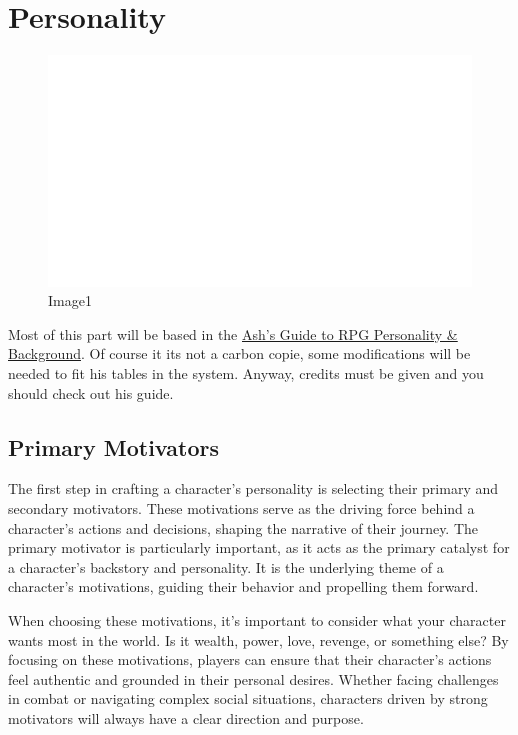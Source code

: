 \hypertarget{personality}{%
\section{Personality}\label{personality}}

\begin{figure}
\centering
\includegraphics{./images/personality01.svg}
\caption{Image1}
\end{figure}

Most of this part will be based in the
\href{https://www.ashami.com/rpg/}{Ash's Guide to RPG Personality \&
Background}. Of course it its not a carbon copie, some modifications
will be needed to fit his tables in the system. Anyway, credits must be
given and you should check out his guide.

\hypertarget{primary-motivators}{%
\subsection{Primary Motivators}\label{primary-motivators}}

The first step in crafting a character's personality is selecting their
primary and secondary motivators. These motivations serve as the driving
force behind a character's actions and decisions, shaping the narrative
of their journey. The primary motivator is particularly important, as it
acts as the primary catalyst for a character's backstory and
personality. It is the underlying theme of a character's motivations,
guiding their behavior and propelling them forward.

When choosing these motivations, it's important to consider what your
character wants most in the world. Is it wealth, power, love, revenge,
or something else? By focusing on these motivations, players can ensure
that their character's actions feel authentic and grounded in their
personal desires. Whether facing challenges in combat or navigating
complex social situations, characters driven by strong motivators will
always have a clear direction and purpose.

